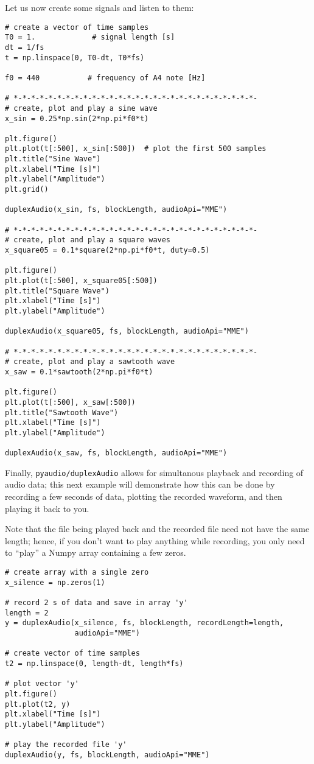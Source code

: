 Let us now create some signals and listen to them:
\begin{lstlisting}[frame=single]
# create a vector of time samples
T0 = 1.             # signal length [s]
dt = 1/fs
t = np.linspace(0, T0-dt, T0*fs)

f0 = 440           # frequency of A4 note [Hz]

# *-*-*-*-*-*-*-*-*-*-*-*-*-*-*-*-*-*-*-*-*-*-*-*-*-*-*-*-
# create, plot and play a sine wave
x_sin = 0.25*np.sin(2*np.pi*f0*t)

plt.figure()
plt.plot(t[:500], x_sin[:500])  # plot the first 500 samples
plt.title("Sine Wave")
plt.xlabel("Time [s]")
plt.ylabel("Amplitude")
plt.grid()

duplexAudio(x_sin, fs, blockLength, audioApi="MME")

# *-*-*-*-*-*-*-*-*-*-*-*-*-*-*-*-*-*-*-*-*-*-*-*-*-*-*-*-
# create, plot and play a square waves
x_square05 = 0.1*square(2*np.pi*f0*t, duty=0.5)

plt.figure()
plt.plot(t[:500], x_square05[:500])
plt.title("Square Wave")
plt.xlabel("Time [s]")
plt.ylabel("Amplitude")

duplexAudio(x_square05, fs, blockLength, audioApi="MME")

# *-*-*-*-*-*-*-*-*-*-*-*-*-*-*-*-*-*-*-*-*-*-*-*-*-*-*-*-
# create, plot and play a sawtooth wave
x_saw = 0.1*sawtooth(2*np.pi*f0*t)

plt.figure()
plt.plot(t[:500], x_saw[:500])
plt.title("Sawtooth Wave")
plt.xlabel("Time [s]")
plt.ylabel("Amplitude")

duplexAudio(x_saw, fs, blockLength, audioApi="MME")
\end{lstlisting}

Finally, {\tt pyaudio/duplexAudio} allows for simultanous playback and recording of audio data; this next example will demonstrate how this can be done by recording a few seconds of data, plotting the recorded waveform, and then playing it back to you.

Note that the file being played back and the recorded file need not have the same length; hence, if you don't want to play anything while recording, you only need to ``play'' a Numpy array containing a few zeros.

\begin{lstlisting}[frame=single]
# create array with a single zero
x_silence = np.zeros(1)

# record 2 s of data and save in array 'y'
length = 2
y = duplexAudio(x_silence, fs, blockLength, recordLength=length,
                audioApi="MME")

# create vector of time samples
t2 = np.linspace(0, length-dt, length*fs)

# plot vector 'y'
plt.figure()
plt.plot(t2, y)
plt.xlabel("Time [s]")
plt.ylabel("Amplitude")

# play the recorded file 'y'
duplexAudio(y, fs, blockLength, audioApi="MME")
\end{lstlisting}

